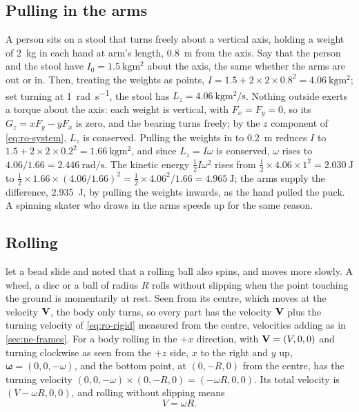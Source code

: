 \subsection*{Pulling in the arms}

A person sits on a stool that turns freely about a vertical axis, holding
a weight of \SI{2}{\kilogram} in each hand at arm's length,
\SI{0.8}{\metre} from the axis. Say that the person and the stool have
$I_0 = \SI{1.5}{\kilogram\metre\squared}$ about the axis, the same whether the arms are out or in. Then, treating
the weights as points, $I = 1.5 + 2\times2\times0.8^2 =
\SI{4.06}{\kilogram\metre\squared}$; set turning at
\SI{1}{\radian\per\second}, the stool has $L_z = \SI{4.06}{\kilogram
\metre\squared\per\second}$. Nothing outside exerts a torque about the
axis: each weight is vertical, with $F_x = F_y = 0$, so its $G_z = xF_y - yF_x$
is zero, and the bearing turns freely; by the $z$ component of
\cref{eq:ro-system}, $L_z$ is conserved. Pulling the weights in to \SI{0.2}{\metre} reduces $I$ to $1.5 +
2\times2\times0.2^2 = \SI{1.66}{\kilogram\metre\squared}$, and since $L_z
= I\omega$ is conserved, $\omega$ rises to $4.06/1.66 = \SI{2.446}{\radian
\per\second}$. The kinetic energy $\frac12 I\omega^2$ rises from
$\frac12\times4.06\times1^2 = \SI{2.030}{\joule}$ to $\frac12\times1.66
\times(4.06/1.66)^2 = \frac12\times4.06^2/1.66 = \SI{4.965}{\joule}$; the arms supply the difference,
\SI{2.935}{\joule}, by pulling the weights inwards, as the hand pulled
the puck. A spinning skater who draws in the arms speeds up for the
same reason.

\subsection*{Rolling}

 let a bead slide and noted that a rolling ball also
spins, and moves more slowly. A wheel, a disc or a ball of radius $R$
rolls without slipping when the point touching the ground is momentarily
at rest. Seen from its centre, which moves at the velocity $\bm{\mathrm{V}}$, the body
only turns, so every part has the velocity $\bm{\mathrm{V}}$ plus the turning velocity
of \cref{eq:ro-rigid} measured from the centre, velocities adding as in
\cref{sec:ne-frames}. For a body rolling in the $+x$ direction, with $\bm{\mathrm{V}}
= (V, 0, 0)$ and turning clockwise as seen from the $+z$ side, $x$ to the
right and $y$ up, $\boldsymbol{\omega} = (0, 0, -\omega)$,
and the bottom point, at $(0, -R, 0)$ from the centre, has the turning
velocity $(0, 0, -\omega)\times(0, -R, 0) = (-\omega R, 0, 0)$. Its total
velocity is $(V - \omega R, 0, 0)$, and rolling without slipping means
\begin{equation*}
   V = \omega R .
\end{equation*}

